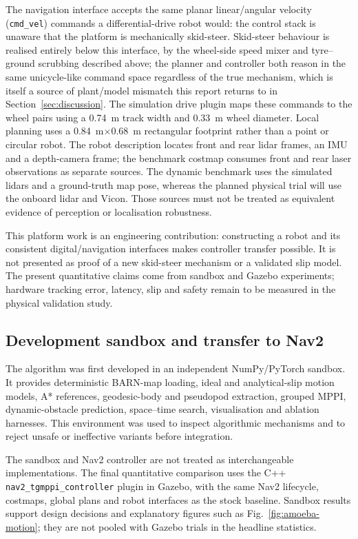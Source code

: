 \documentclass[journal]{IEEEtran}
\begin{document}
The navigation interface accepts the same planar linear/angular velocity
(\texttt{cmd\_vel}) commands a differential-drive robot would: the control
stack is unaware that the platform is mechanically skid-steer. Skid-steer
behaviour is realised entirely below this interface, by the wheel-side speed
mixer and tyre--ground scrubbing described above; the planner and controller
both reason in the same unicycle-like command space regardless of the true
mechanism, which is itself a source of plant/model mismatch this report
returns to in Section~\ref{sec:discussion}.
The simulation drive plugin maps these commands to the wheel pairs using a
\SI{0.74}{m} track width and \SI{0.33}{m} wheel diameter. Local planning uses a
\SI{0.84}{m}$\times$\SI{0.68}{m} rectangular footprint rather than a point or
circular robot. The robot description locates front and rear lidar frames, an
IMU and a depth-camera frame; the benchmark costmap consumes front and rear
laser observations as separate sources. The dynamic benchmark uses the
simulated lidars and a ground-truth map pose, whereas the planned physical
trial will use the onboard lidar and Vicon. Those sources must not be treated
as equivalent evidence of perception or localisation robustness.

This platform work is an engineering contribution: constructing a robot and
its consistent digital/navigation interfaces makes controller transfer
possible. It is not presented as proof of a new skid-steer mechanism or a
validated slip model. The present quantitative claims come from sandbox and
Gazebo experiments; hardware tracking error, latency, slip and safety remain
to be measured in the physical validation study.

\subsection{Development sandbox and transfer to Nav2}
The algorithm was first developed in an independent NumPy/PyTorch sandbox. It
provides deterministic BARN-map loading, ideal and analytical-slip motion
models, A* references, geodesic-body and pseudopod extraction, grouped MPPI,
dynamic-obstacle prediction, space--time search, visualisation and ablation
harnesses. This environment was used to inspect algorithmic mechanisms and to
reject unsafe or ineffective variants before integration.

The sandbox and Nav2 controller are not treated as interchangeable
implementations. The final quantitative comparison uses the C++
\texttt{nav2\_tgmppi\_controller} plugin in Gazebo, with the same Nav2 lifecycle,
costmaps, global plans and robot interfaces as the stock baseline. Sandbox
results support design decisions and explanatory figures such as
Fig.~\ref{fig:amoeba-motion}; they are not pooled with Gazebo trials in the
headline statistics.
\end{document}
